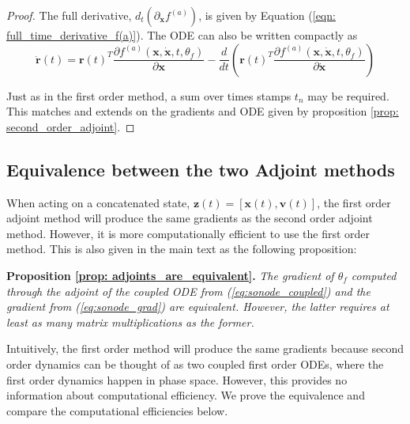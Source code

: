 \documentclass{article}
\theoremstyle{remark}
\theoremstyle{definition}
\begin{document}
\begin{proof}
The full derivative, $d_{t}(\partial_{\dot{\mathbf{x}}}f^{(a)})$, is given by Equation (\ref{eqn: full_time_derivative_f(a)}). The ODE can also be written compactly as
\begin{equation}
\label{eqn: compact_ode_second_order_adjoint}
    \ddot{\mathbf{r}}(t) = \mathbf{r}(t)^{T}\frac{\partial f^{(a)}(\mathbf{x}, \dot{\mathbf{x}}, t, \theta_{f})}{\partial \mathbf{x}} - \frac{d}{dt}\left(
    \mathbf{r}(t)^{T}\frac{\partial f^{(a)}(\mathbf{x}, \dot{\mathbf{x}}, t, \theta_{f})}{\partial \dot{\mathbf{x}}}
    \right) 
\end{equation}

Just as in the first order method, a sum over times stamps $t_{n}$ may be required. This matches and extends on the gradients and ODE given by proposition \ref{prop: second_order_adjoint}.
\end{proof}

\subsection{Equivalence between the two Adjoint methods}

When acting on a concatenated state, $\mathbf{z}(t) = [\mathbf{x}(t), \mathbf{v}(t)]$, the first order adjoint method will produce the same gradients as the second order adjoint method. However, it is more computationally efficient to use the first order method. This is also given in the main text as the following proposition:

\textbf{Proposition \ref{prop: adjoints_are_equivalent}.}\textit{
The gradient of $\theta_f$ computed through the adjoint of the coupled ODE from (\ref{eq:sonode_coupled}) and the gradient from (\ref{eq:sonode_grad}) are equivalent. However, the latter requires at least as many matrix multiplications as the former. }

Intuitively, the first order method will produce the same gradients because second order dynamics can be thought of as two coupled first order ODEs, where the first order dynamics happen in phase space. However, this provides no information about computational efficiency. We prove the equivalence and compare the computational efficiencies below.
\end{document}
